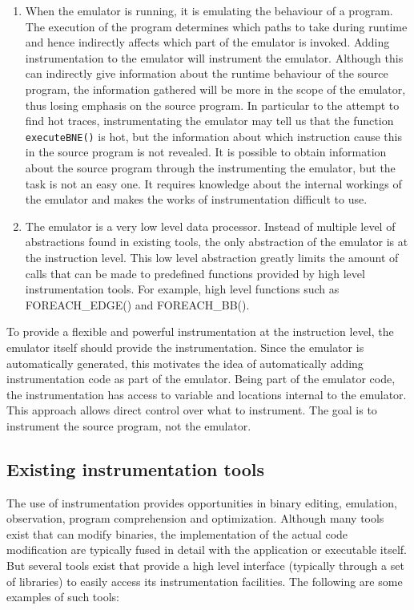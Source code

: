 \begin{enumerate}
\item When the emulator is running, it is emulating the behaviour of a program. 
The execution of the program determines which paths to take during runtime and 
hence indirectly affects which part of the emulator is invoked.  Adding 
instrumentation to the emulator will instrument the emulator.  
Although this can indirectly give information about the runtime behaviour of 
the source program, the information gathered will be more in the scope of the 
emulator, thus losing emphasis on the source program.  
In particular to the attempt to find hot traces, instrumentating the emulator 
may tell us that the function \texttt{executeBNE()} is hot, but the 
information about which instruction cause this in the source program is 
not revealed.  
It is possible to obtain information about the source program through the 
instrumenting the emulator, but the task is not an easy one.  It requires 
knowledge about the internal workings of the emulator and makes the works of 
instrumentation difficult to use.

\item The emulator is a very low level data processor.  Instead of multiple 
level of abstractions found in existing tools, the only abstraction of the 
emulator is at the instruction level.  
This low level abstraction greatly limits the amount of calls that can be 
made to predefined functions provided by high level instrumentation tools.  
For example, high level functions such as FOREACH\_EDGE() and FOREACH\_BB().
\end{enumerate}

To provide a flexible and powerful instrumentation at the instruction level, 
the emulator itself should provide the instrumentation.  Since the emulator 
is automatically generated, this motivates the idea of automatically adding 
instrumentation code as part of the emulator. 
Being part of the emulator code, the instrumentation has access to variable 
and locations internal to the emulator.  This approach allows direct control 
over what to instrument.  The goal is to instrument the source program, not the 
emulator. 


\subsection{Existing instrumentation tools}
The use of instrumentation provides opportunities in binary editing, emulation,
observation, program comprehension and optimization.  Although many tools exist
that can modify binaries, the implementation of the actual code modification 
are typically fused in detail with the application or executable itself.  
But several tools exist that provide a high level interface (typically 
through a set of libraries) to easily access its instrumentation facilities.  
The following are some examples of such tools:

